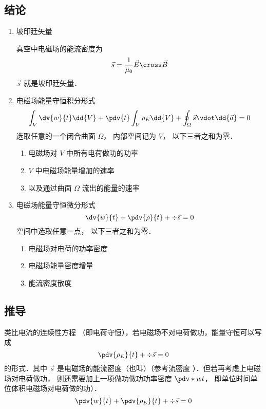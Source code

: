



\subsection{结论}
\begin{enumerate}
\item 坡印廷矢量

真空中电磁场的能流密度为
\begin{equation}
\vec s = \frac{1}{\mu_0} \vec E \cross \vec B
\end{equation} 
$\vec s$ 就是坡印廷矢量．


\item 电磁场能量守恒积分形式
\begin{equation}
\int_V \dv{w}{t} \dd{V}  + \pdv{t} \int_V \rho_E \dd{V}  + \oint_\Omega  \vec s \vdot \dd{\vec a}  = 0
\end{equation} 
选取任意的一个闭合曲面 $\Omega $， 内部空间记为 $V$， 以下三者之和为零．
\begin{enumerate}
\item 电磁场对 $V$ 中所有电荷做功的功率
\item $V$ 中电磁场能量增加的速率
\item 以及通过曲面 $\Omega $ 流出的能量的速率
\end{enumerate}

\item 电磁场能量守恒微分形式
\begin{equation}
\dv{w}{t} + \pdv{\rho}{t} + \div \vec s = 0
\end{equation} 
空间中选取任意一点， 以下三者之和为零．
\begin{enumerate}
\item 电磁场对电荷的功率密度
\item 电磁场能量密度增量
\item 能流密度散度
\end{enumerate}
\end{enumerate}

\subsection{推导}
类比电流的连续性方程%
（即电荷守恒），若电磁场不对电荷做功，能量守恒可以写成
\begin{equation}
\pdv{\rho_E}{t} + \div \vec s = 0
\end{equation} 
的形式．其中 $\vec s$ 是电磁场的能流密度（也叫）（参考流密度%
）．但若再考虑上电磁场对电荷做功， 则还需要加上一项做功做功功率密度 $\pdv*{w}{t}$， 即单位时间单位体积电磁场对电荷做的功）．
\begin{equation}\label{EBS_eq1}
\pdv{w}{t} + \pdv{\rho_E}{t} + \div \vec s = 0
\end{equation} 

